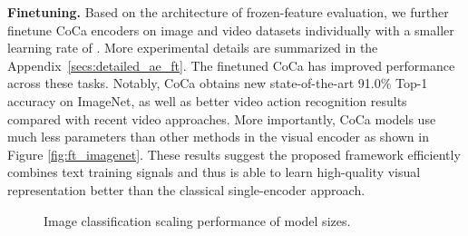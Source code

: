 \textbf{Finetuning.} Based on the architecture of frozen-feature evaluation, we further finetune CoCa encoders on image and video datasets individually with a smaller learning rate of . More experimental details are summarized in the Appendix~\ref{secs:detailed_ae_ft}.
The finetuned CoCa has improved performance across these tasks.
Notably, CoCa obtains new state-of-the-art 91.0\% Top-1 accuracy on ImageNet, as well as better video action recognition results compared with recent video approaches.
More importantly, CoCa models use much less parameters than other methods in the visual encoder as shown in Figure \ref{fig:ft_imagenet}.
These results suggest the proposed framework efficiently combines text training signals and thus is able to learn high-quality visual representation better than the classical single-encoder approach.


\begin{figure}\centering
{}\qquad
{}
\caption{Image classification scaling performance of model sizes.}
\end{figure}

  

